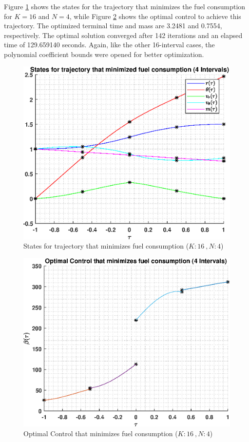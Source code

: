 \documentclass[]{article}
\begin{document}
Figure \ref{fig:directStatesK16Poly4} shows the states for the trajectory that minimizes the fuel consumption for \(K = 16\) and  \(N = 4\), while Figure \ref{fig:directControlK16Poly4} shows the optimal control to achieve this trajectory. The optimized terminal time and mass are 3.2481 and 0.7554, respectively. The optimal solution converged after 142 iterations and an elapsed time of 129.659140 seconds. Again, like the other 16-interval cases, the polynomial coefficient bounds were opened for better optimization. 
\begin{figure}
	\centering
	\includegraphics[scale=0.75]{directStatesK16Poly4.eps}
	\caption{States for trajectory that minimizes fuel consumption (\(K:16\ , N:4\))}
	\label{fig:directStatesK16Poly4}
\end{figure}
\begin{figure}
	\centering
	\includegraphics[scale=0.75]{directControlK16Poly4.eps}
	\caption{Optimal Control that minimizes fuel consumption (\(K:16\ , N:4\))}
	\label{fig:directControlK16Poly4}
\end{figure}
\FloatBarrier
\end{document}
